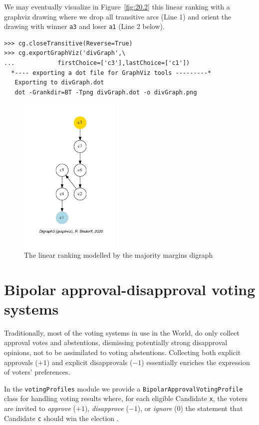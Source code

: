 We may eventually visualize in Figure~\vref{fig:20.2} this linear ranking with a graphviz drawing where we drop all transitive arcs (Line 1) and orient the drawing with \Condorcet winner \texttt{a3} and loser \texttt{a1} (Line 2 below).
\begin{lstlisting}
>>> cg.closeTransitive(Reverse=True)
>>> cg.exportGraphViz('divGraph',\
...            firstChoice=['c3'],lastChoice=['c1'])
  *---- exporting a dot file for GraphViz tools ---------*
   Exporting to divGraph.dot
   dot -Grankdir=BT -Tpng divGraph.dot -o divGraph.png
\end{lstlisting}
\begin{figure}[ht]
\sidecaption[t]
\includegraphics[width=5cm]{Figures/20-2-divGraph.pdf}
\caption{The linear ranking modelled by the majority margins digraph} 
\label{fig:20.2}       %
\end{figure}

\section{Bipolar approval-disapproval voting systems}
\label{sec:20.2}

Traditionally, most of the voting systems in use in the World, do only collect approval votes and abstentions, dismissing potentially strong disapproval opinions, not to be assimilated to voting abstentions. Collecting both explicit approvals ($+1$) and explicit disapprovals ($-1$) essentially enriches the expression of voters' preferences. 

In the \texttt{votingProfiles} module we provide a \texttt{BipolarApprovalVot\-ingProfile} class for handling voting results where, for each eligible Candidate \texttt{x}, the voters are invited  to \emph{approve} ($+1$), \emph{disapprove} ($-1$), or \emph{ignore} ($0$) the statement that Candidate \texttt{c} should win the election \citep{BAU-2012}.

